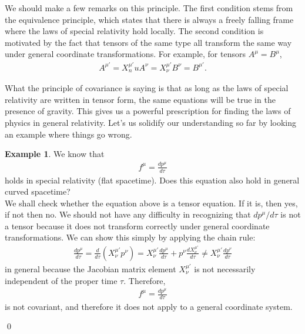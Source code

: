 \documentclass{book}
\theoremstyle{definition}
\newtheorem{exmp}{Example}[section]
\begin{document}
We should make a few remarks on this principle. The first condition stems from the equivalence principle, which states that there is always a freely falling frame where the laws of special relativity hold locally. The second condition is motivated by the fact that tensors of the same type all transform the same way under general coordinate transformations. For example, for tensors $A^{\mu} = B^\mu$,
\begin{align*}
A^{\mu'} = X^{\mu'}_nuA^\nu = X^{\mu'}_\nu B^{\nu} = B^{\mu'}.
\end{align*}

What the principle of covariance is saying is that as long as the laws of special relativity are written in tensor form, the same equations will be true in the presence of gravity. This gives us a powerful prescription for finding the laws of physics in general relativity. Let's us solidify our understanding so far by looking an example where things go wrong.\\
\begin{exmp}
	We know that 
	\begin{align*}
	f^\mu = \frac{dp^\mu}{d\tau}
	\end{align*}
	holds in special relativity (flat spacetime). Does this equation also hold in general curved spacetime?\\
	
	We shall check whether the equation above is a tensor equation. If it is, then yes, if not then no. We should not have any difficulty in recognizing that $dp^\mu/d\tau$ is not a tensor because it does not transform correctly under general coordinate transformations. We can show this simply by applying the chain rule:
	\begin{align*}
	\frac{dp^\mu}{d\tau} = \frac{d}{d\tau}\left(X^{\mu'}_\nu p^{\nu} \right) = X^{\mu'}_\nu\frac{dp^\mu}{d\tau} + p^\nu\frac{dX^{\mu'}_\nu}{d\tau} \neq X^{\mu'}_\nu \frac{dp^\nu}{d\tau}
	\end{align*}
	in general because the Jacobian matrix element $X^{\mu'}_\nu$ is not necessarily independent of the proper time $\tau$. Therefore, 
	\begin{align*}
	f^\mu = \frac{dp^\mu}{d\tau}
	\end{align*}
	is not covariant, and therefore it does not apply to a general coordinate system.\\
\end{exmp}\qed
\end{document}
